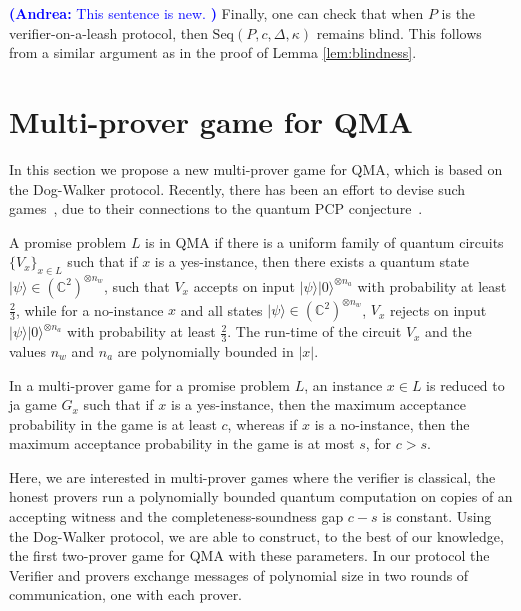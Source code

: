 \documentclass[11pt]{article}
\theoremstyle{remark}
\theoremstyle{definition}
\newcommand{\ket}[1]{|#1\rangle}
\newcommand{\C}{\ensuremath{\mathbb{C}}}
\newcommand{\anote}[1]{\textcolor{blue}{\small {\textbf{(Andrea:} #1 \textbf{) }}}}
\begin{document}
\anote{This sentence is new.} Finally, one can check that when $P$ is the verifier-on-a-leash protocol, then $\mbox{Seq}(P,c,\Delta, \kappa)$ remains blind. This follows from a similar argument as in the proof of Lemma \ref{lem:blindness}.

\appendix




\section{Multi-prover game for QMA}\label{sec:qma}

In this section we propose a new multi-prover game for QMA, which is based on the Dog-Walker
protocol.
Recently, there has been an effort to devise such games~\cite{FitzsimonsV15,Ji16,natarajan2016robust},
due to their connections to the quantum PCP conjecture~\cite{AharonovAV13}.


A promise problem $L$ is in QMA if there is a uniform family
of quantum circuits $\{V_x\}_{x \in L}$ such that if $x$ is a yes-instance, then there exists a
quantum state $\ket{\psi} \in \left(\C^2\right)^{\otimes n_w}$, such that
$V_x$  accepts on input $\ket{\psi}\ket{0}^{\otimes n_a}$ with probability at least
$\frac{2}{3}$, while for a no-instance $x$ and  all states $\ket{\psi} \in
\left(\C^2\right)^{\otimes n_w}$, $V_x$
rejects on input $\ket{\psi}\ket{0}^{\otimes n_a}$ with probability at
least $\frac{2}{3}$. The run-time of the circuit $V_x$ and the values $n_w$ and $n_a$ are polynomially bounded in $|x|$.

 In a multi-prover game for a promise problem $L$, an
 instance $x \in L$ is reduced to ja game $G_x$ such that if $x$ is a yes-instance, then the maximum
 acceptance probability in the game is at least $c$, whereas if $x$ is a
 no-instance,
 then the maximum acceptance probability in the game is  at most $s$, for $c
 > s$.

 Here, we are interested in multi-prover games where the verifier is classical,
 the honest provers run a polynomially bounded quantum computation on copies
 of an accepting witness and the completeness-soundness gap $c-s$ is constant.
Using the Dog-Walker protocol, we are able to construct, to the best of our knowledge, the first two-prover
game for QMA with these parameters. In our protocol the Verifier and provers exchange messages of polynomial size 
in two rounds of communication, one with each
prover.
\end{document}
